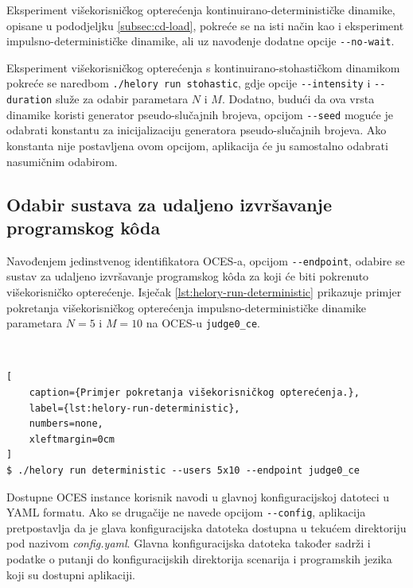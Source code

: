 \documentclass[times, utf8, diplomski]{fer}
\begin{document}
Eksperiment višekorisničkog opterećenja kontinuirano-determinističke dinamike, opisane u pododjeljku \ref{subsec:cd-load}, pokreće se na isti način kao i eksperiment impulsno-determinističke dinamike, ali uz navođenje dodatne opcije \lstinline{--no-wait}.

Eksperiment višekorisničkog opterećenja s kontinuirano-stohastičkom dinamikom pokreće se naredbom \lstinline{./helory run stohastic}, gdje opcije \lstinline{--intensity} i \lstinline{--duration} služe za odabir parametara $N$ i $M$. Dodatno, budući da ova vrsta dinamike koristi generator pseudo-slučajnih brojeva, opcijom \lstinline{--seed} moguće je odabrati konstantu za inicijalizaciju generatora pseudo-slučajnih brojeva. Ako konstanta nije postavljena ovom opcijom, aplikacija će ju samostalno odabrati nasumičnim odabirom.

\subsection{Odabir sustava za udaljeno izvršavanje programskog kôda}
Navođenjem jedinstvenog identifikatora OCES-a, opcijom \lstinline{--endpoint}, odabire se sustav za udaljeno izvršavanje programskog kôda za koji će biti pokrenuto višekorisničko opterećenje. Isječak \ref{lst:helory-run-deterministic} prikazuje primjer pokretanja višekorisničkog opterećenja impulsno-determinističke dinamike parametara $N=5$ i $M=10$ na OCES-u \lstinline{judge0_ce}.

\

\begin{lstlisting}[
    caption={Primjer pokretanja višekorisničkog opterećenja.},
    label={lst:helory-run-deterministic},
    numbers=none,
    xleftmargin=0cm
]
$ ./helory run deterministic --users 5x10 --endpoint judge0_ce
\end{lstlisting}

Dostupne OCES instance korisnik navodi u glavnoj konfiguracijskoj datoteci u YAML formatu. Ako se drugačije ne navede opcijom \lstinline{--config}, aplikacija pretpostavlja da je glava konfiguracijska datoteka dostupna u tekućem direktoriju pod nazivom \textit{config.yaml}. Glavna konfiguracijska datoteka također sadrži i podatke o putanji do konfiguracijskih direktorija scenarija i programskih jezika koji su dostupni aplikaciji.

\pagebreak
\end{document}
